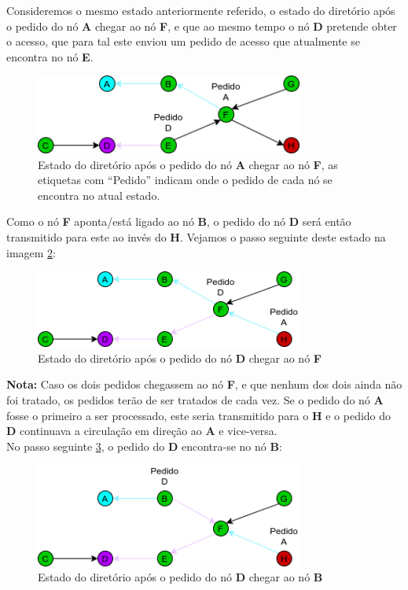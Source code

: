 Consideremos o mesmo estado anteriormente referido, o estado do diretório após o pedido do nó \textbf{A} chegar ao nó \textbf{F}, e que ao mesmo tempo o nó \textbf{D} pretende obter o acesso, que para tal este enviou um pedido de acesso que atualmente se encontra no nó \textbf{E}.


\begin{figure}[!htb]
\centering
\includegraphics[width=250pt]{dois_pedidos_1.png}
\caption{Estado do diretório após o pedido do nó \textbf{A} chegar ao nó \textbf{F}, as etiquetas com ``Pedido'' indicam onde o pedido de cada nó se encontra no atual estado.}
\label{motivacao:img:apos_chegar_f_etiquetas}
\end{figure}

Como o nó \textbf{F} aponta/está ligado ao nó \textbf{B}, o pedido do nó \textbf{D} será então transmitido para este ao invés do \textbf{H}.
Vejamos o passo seguinte deste estado na imagem \ref{motivacao:img:d_chega_f}:


\begin{figure}[!htb]
\centering
\includegraphics[width=250pt]{dois_pedidos_2.png}
\caption{Estado do diretório após o pedido do nó \textbf{D} chegar ao nó \textbf{F}}
\label{motivacao:img:d_chega_f}
\end{figure}

\textbf{Nota:} Caso os dois pedidos chegassem ao nó \textbf{F}, e que nenhum dos dois ainda não foi tratado, os pedidos terão de ser tratados de cada vez. Se o pedido do nó \textbf{A} fosse o primeiro a ser processado, este seria transmitido para o \textbf{H} e o pedido do \textbf{D} continuava a circulação em direção ao \textbf{A} e vice-versa. \\

No passo seguinte \ref{motivacao:img:d_chega_b}, o pedido do \textbf{D} encontra-se no nó \textbf{B}:


\begin{figure}[!htb]
\centering
\includegraphics[width=250pt]{dois_pedidos_3.png}
\caption{Estado do diretório após o pedido do nó \textbf{D} chegar ao nó \textbf{B}}
\label{motivacao:img:d_chega_b}
\end{figure}

